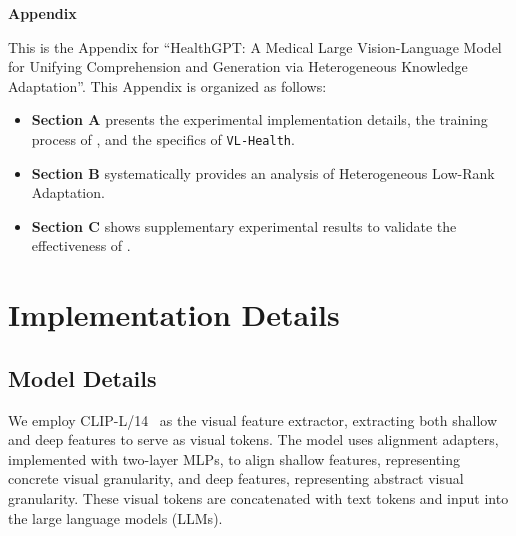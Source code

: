 \begin{center}
\Large \textbf{Appendix}
\end{center}
This is the Appendix for ``HealthGPT: A Medical Large Vision-Language Model for Unifying
Comprehension and Generation via Heterogeneous Knowledge Adaptation''. This Appendix is organized as follows: 

\begin{itemize}
\item \textbf{Section A} presents the experimental implementation details, the training process of \ourmethod{}, and the specifics of \texttt{VL-Health}.
\item \textbf{Section B} systematically provides an analysis of Heterogeneous Low-Rank Adaptation.
\item \textbf{Section C} shows supplementary experimental results to validate the effectiveness of \ourmethod{}.
\end{itemize}

\section{Implementation Details}
\subsection{Model Details}
We employ CLIP-L/14~\cite{radford2021learning} as the visual feature extractor, extracting both shallow and deep features to serve as visual tokens. The model uses alignment adapters, implemented with two-layer MLPs, to align shallow features, representing concrete visual granularity, and deep features, representing abstract visual granularity. These visual tokens are concatenated with text tokens and input into the large language models (LLMs).

